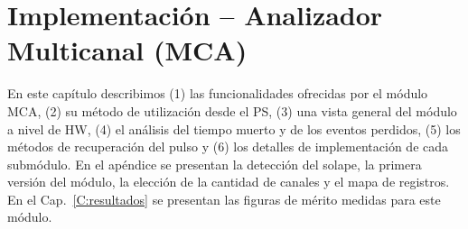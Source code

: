 \chapter{Implementación -- Analizador Multicanal (MCA)}
\label{C:implmca}

\graphicspath{{figs/cap7/}{figs/comunes/}}

\begin{destacado}
En este capítulo describimos (1) las funcionalidades ofrecidas por el módulo
MCA, (2) su método de utilización desde el PS, (3) una vista general del módulo
a nivel de HW, (4) el análisis del tiempo muerto y de los eventos perdidos, (5)
los métodos de recuperación del pulso y (6) los detalles de implementación de
cada submódulo. En el apéndice se presentan la detección del solape, la primera
versión del módulo, la elección de la cantidad de canales y el mapa de
registros. En el Cap.~\ref{C:resultados} se presentan las figuras de mérito
medidas para este módulo.
\end{destacado}

